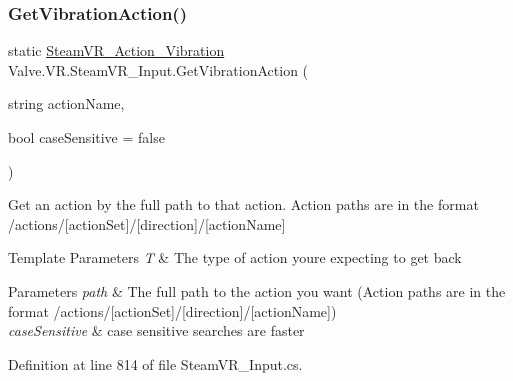 \mbox{\label{class_valve_1_1_v_r_1_1_steam_v_r___input_a9ebbd824b3b2e03863a1227dd875ea02}} 
\subsubsection{\texorpdfstring{GetVibrationAction()}{GetVibrationAction()}\hspace{0.1cm}{\footnotesize\ttfamily [2/2]}}
{\footnotesize\ttfamily static \mbox{\hyperlink{class_valve_1_1_v_r_1_1_steam_v_r___action___vibration}{Steam\+V\+R\+\_\+\+Action\+\_\+\+Vibration}} Valve.\+V\+R.\+Steam\+V\+R\+\_\+\+Input.\+Get\+Vibration\+Action (\begin{DoxyParamCaption}\item[{string}]{action\+Name,  }\item[{bool}]{case\+Sensitive = {\ttfamily false} }\end{DoxyParamCaption})\hspace{0.3cm}{\ttfamily [static]}}



Get an action by the full path to that action. Action paths are in the format /actions/\mbox{[}action\+Set\mbox{]}/\mbox{[}direction\mbox{]}/\mbox{[}action\+Name\mbox{]} 


\begin{DoxyTemplParams}{Template Parameters}
{\em T} & The type of action you\textquotesingle{}re expecting to get back\\
\hline
\end{DoxyTemplParams}

\begin{DoxyParams}{Parameters}
{\em path} & The full path to the action you want (Action paths are in the format /actions/\mbox{[}action\+Set\mbox{]}/\mbox{[}direction\mbox{]}/\mbox{[}action\+Name\mbox{]})\\
\hline
{\em case\+Sensitive} & case sensitive searches are faster\\
\hline
\end{DoxyParams}


Definition at line 814 of file Steam\+V\+R\+\_\+\+Input.\+cs.

\mbox{\label{class_valve_1_1_v_r_1_1_steam_v_r___input_ad17ec850cff6999077412a0a2a09c317}} 
